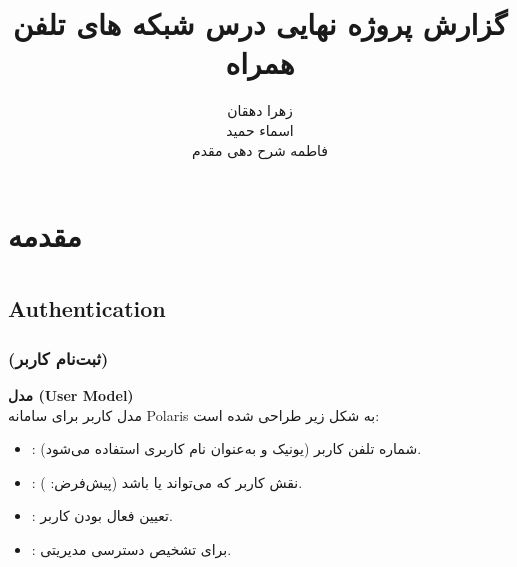 \documentclass{report}
\title{گزارش پروژه نهایی درس شبکه های تلفن همراه}
\author{زهرا دهقان\\اسماء حمید\\فاطمه شرح دهی مقدم}
\begin{document}
\Godpage
\maketitle
{}
\tableofcontents


\chapter{مقدمه}








\chapter{ }

\section{Authentication}

\subsection{ (ثبت‌نام کاربر)}
\textbf{مدل (User Model)} \\
مدل کاربر برای سامانه Polaris به شکل زیر طراحی شده است:

\begin{itemize}
  \item {}: شماره تلفن کاربر (یونیک و به‌عنوان نام کاربری استفاده می‌شود).
  \item {}: نقش کاربر که می‌تواند  یا  باشد (پیش‌فرض: ).
  \item {}: تعیین فعال بودن کاربر.
  \item {}: برای تشخیص دسترسی مدیریتی.
\end{itemize}
\end{document}
